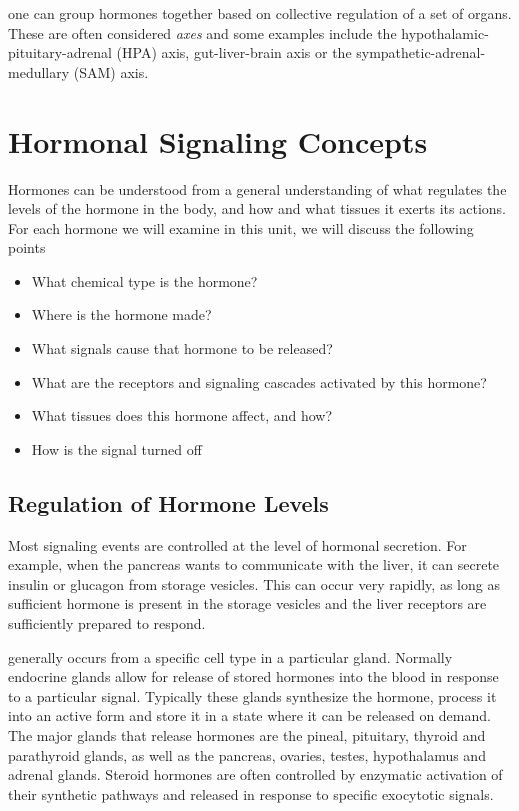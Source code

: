 \documentclass{tufte-handout}
\begin{document}
 one can group hormones together based on collective regulation  of a set of organs.  These are often considered \emph{axes} and some examples include the hypothalamic-pituitary-adrenal (HPA) axis, gut-liver-brain axis or the sympathetic-adrenal-medullary (SAM) axis. 

\section{Hormonal Signaling Concepts}

Hormones can be understood from a general understanding of what regulates the levels of the hormone in the body, and how and what tissues it exerts its actions.  For each hormone we will examine in this unit, we will discuss the following points

\begin{itemize}
\item What chemical type is the hormone?
\item Where is the hormone made?
\item What signals cause that hormone to be released?
\item What are the receptors and signaling cascades activated by this hormone?
\item What tissues does this hormone affect, and how?
\item How is the signal turned off
\end{itemize}

\subsection{Regulation of Hormone Levels}

Most signaling events are controlled at the level of hormonal secretion.  For example, when the pancreas wants to communicate with the liver, it can secrete insulin or glucagon from storage vesicles.  This can occur very rapidly, as long as sufficient hormone is present in the storage vesicles and the liver receptors are sufficiently prepared to respond.

 generally occurs from a specific cell type in a particular gland.  Normally endocrine glands allow for release of stored hormones into the blood in response to a particular signal.  Typically these glands synthesize the hormone, process it into an active form and store it in a state where it can be released on demand.  The major glands that release hormones are the pineal, pituitary, thyroid and parathyroid glands, as well as the pancreas, ovaries, testes, hypothalamus and adrenal glands.  Steroid hormones are often controlled by enzymatic activation of their synthetic pathways and released in response to specific exocytotic signals.  
\end{document}
